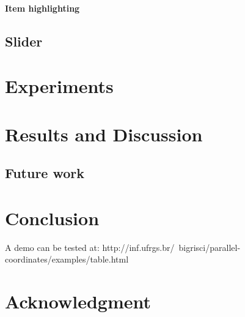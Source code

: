 \documentclass[10pt, conference]{IEEEtran}
\begin{document}
\paragraph*{Item highlighting}

\subsection{Slider}

\section{Experiments}
%


\section{Results and Discussion}
%

%


\subsection{Future work}
%


\section{Conclusion}
%
A demo can be tested at: http://inf.ufrgs.br/~bigrisci/parallel-coordinates/examples/table.html


\iffinal
\section*{Acknowledgment}
%

\fi







\end{document}
